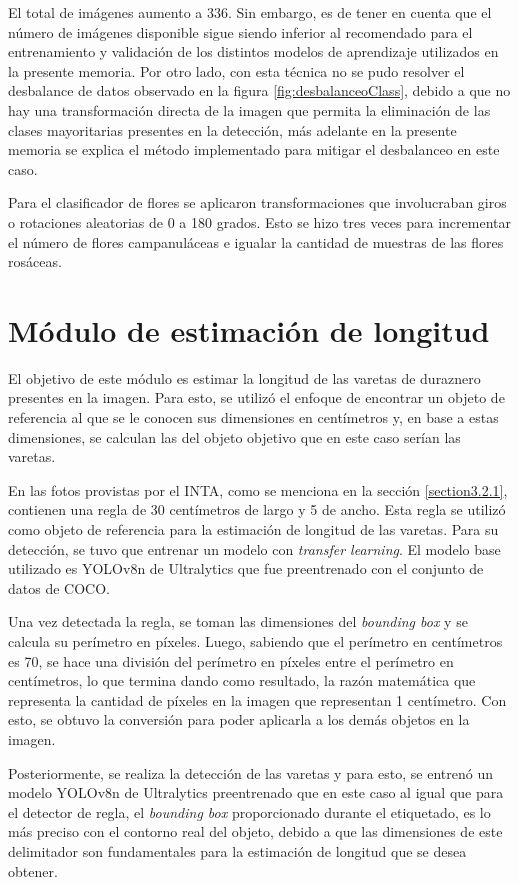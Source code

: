 El total de imágenes aumento a 336. Sin embargo, es de tener en cuenta que el número de imágenes disponible sigue siendo inferior al recomendado para el entrenamiento y validación de los distintos modelos de aprendizaje utilizados en la presente memoria. Por otro lado, con esta técnica no se pudo resolver el desbalance de datos observado en la figura \ref{fig:desbalanceoClass}, debido a que no hay una transformación directa de la imagen que permita la eliminación de las clases mayoritarias presentes en la detección, más adelante en la presente memoria se explica el método implementado para mitigar el desbalanceo en este caso. 

Para el clasificador de flores se aplicaron transformaciones que involucraban giros o rotaciones aleatorias de 0 a 180 grados. Esto se hizo tres veces para incrementar el número de flores campanuláceas e igualar la cantidad de muestras de las flores rosáceas.

\section{Módulo de estimación de longitud}

El objetivo de este módulo es estimar la longitud de las varetas de duraznero presentes en la imagen. Para esto, se utilizó el enfoque de encontrar un objeto de referencia al que se le conocen sus dimensiones en centímetros y, en base a estas dimensiones, se calculan las del objeto objetivo que en este caso serían las varetas. 

En las fotos provistas por el INTA, como se menciona en la sección \ref{section3.2.1}, contienen una regla de 30 centímetros de largo y 5 de ancho. Esta regla se utilizó como objeto de referencia para la estimación de longitud de las varetas. Para su detección, se tuvo que entrenar un modelo con \textit{transfer learning}. El modelo base utilizado es YOLOv8n de Ultralytics que fue preentrenado con el conjunto de datos de COCO.

Una vez detectada la regla, se toman las dimensiones del \textit{bounding box} y se calcula su perímetro en píxeles. Luego, sabiendo que el perímetro en centímetros es 70, se hace una división del perímetro en píxeles entre el perímetro en centímetros, lo que termina dando como resultado, la razón matemática que representa la cantidad de píxeles en la imagen que representan 1 centímetro. Con esto, se obtuvo la conversión para poder aplicarla a los demás objetos en la imagen.

Posteriormente, se realiza la detección de las varetas y para esto, se entrenó un modelo YOLOv8n de Ultralytics preentrenado que en este caso al igual que para el detector de regla, el \textit{bounding box} proporcionado durante el etiquetado, es lo más preciso con el contorno real del objeto, debido a que las dimensiones de este delimitador son fundamentales para la estimación de longitud que se desea obtener. 

